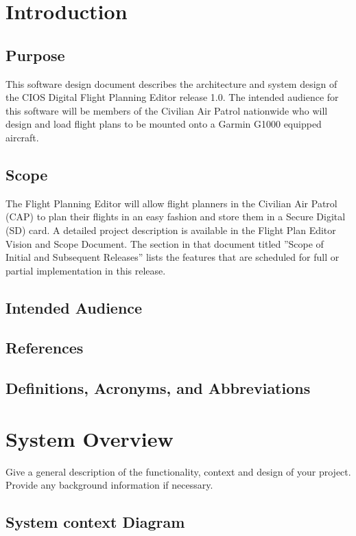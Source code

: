 \documentclass[12pt, letterpaper]{article}
\begin{document}
\section{Introduction}
  \subsection{Purpose}
    This software design document describes the architecture and system design of the CIOS Digital Flight Planning Editor release 1.0.
    The intended audience for this software will be members of the Civilian Air Patrol nationwide who will design and load flight plans to be mounted onto a Garmin G1000 equipped aircraft.

\subsection{Scope}
  The Flight Planning Editor will allow flight planners in the Civilian Air Patrol (CAP) to plan their flights in an easy fashion and store them in a Secure Digital (SD) card. A detailed project description is available in the Flight Plan Editor Vision and Scope Document. The section in that document titled ”Scope of Initial and Subsequent Releases” lists the features that are scheduled for full or partial implementation in this release.

  \subsection{Intended Audience}

  \subsection{References}

  \subsection{Definitions, Acronyms, and Abbreviations}

\section{System Overview}
Give a general description of the functionality, context and design of your project. Provide any background information if necessary.
  \subsection{System context Diagram}
\end{document}
